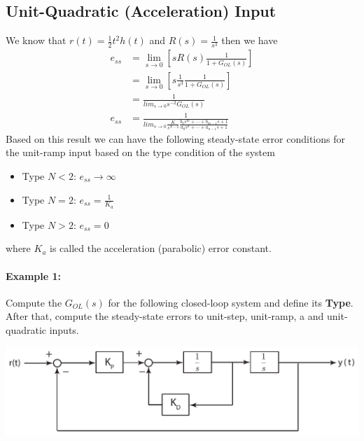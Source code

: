 \documentclass[twoside]{article}
\begin{document}
\subsection*{Unit-Quadratic (Acceleration) Input}
%
We know that $r(t) = \frac{1}{2} t^2 h(t)$ and $R(s) = \frac{1}{s^3}$ then
we have
\begin{align*}
e_{ss} &= \lim_{s \to 0} \left[ s R(s) \frac{1}{1
         + G_{OL} (s) } \right]
\\
&= \lim_{s \to 0} \left[ s \frac{1}{s^3} \frac{1}{1
         + G_{OL} (s) } \right]
\\
 &= \frac{1}{lim_{s \to 0} s^{-2} G_{OL} (s) }
\\
e_{ss} &= \frac{1}{lim_{s \to 0} \frac{K}{s^{N-2}} \frac{b_0 s^m + \cdots + b_{m-1} s + 1}{a_0 s^n + \cdots + a_{n-1} s + 1} }
\end{align*}
%
Based on this result we can have the following steady-state
error conditions for the unit-ramp input based on the type 
condition of the system
%
\begin{itemize}
\item Type $N < 2$: $e_{ss} \to  \infty$
\item Type $N = 2$: $e_{ss} = \frac{1}{K_{a}}$
\item Type $N > 2$: $e_{ss} = 0$
\end{itemize}
%
where $K_a$ is called the acceleration (parabolic) error constant.

\paragraph{Example 1:} Compute the $G_{OL}(s)$ for the following closed-loop
system and define its \textbf{Type}. After that, compute the steady-state errors to unit-step, unit-ramp, a
and unit-quadratic inputs.

\begin{center}
\begin{minipage}[h]{0.75\linewidth}
    \begin{center}
      \includegraphics[width=\textwidth]{example}
    \end{center}
\end{minipage}
\end{center}
\end{document}
